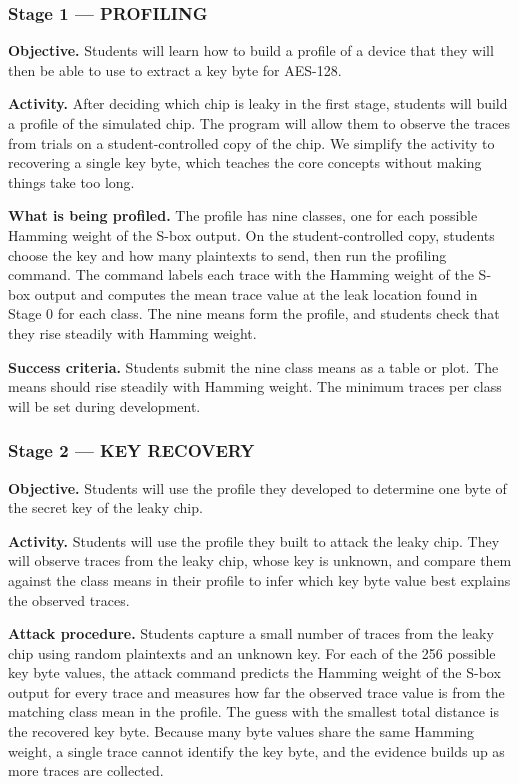 \documentclass[11pt]{article}
\begin{document}
\subsubsection*{Stage 1 --- PROFILING}

\noindent\textbf{Objective.} Students will learn how to build a profile of a device that they will then be able to use to extract a key byte for AES-128.

\noindent\textbf{Activity.} After deciding which chip is leaky in the first stage, students will build a profile of the simulated chip. The program will allow them to observe the traces from trials on a student-controlled copy of the chip. We simplify the activity to recovering a single key byte, which teaches the core concepts without making things take too long. 

\noindent\textbf{What is being profiled.} The profile has nine classes, one for each possible Hamming weight of the S-box output. On the student-controlled copy, students choose the key and how many plaintexts to send, then run the profiling command. The command labels each trace with the Hamming weight of the S-box output and computes the mean trace value at the leak location found in Stage 0 for each class. The nine means form the profile, and students check that they rise steadily with Hamming weight.

\noindent\textbf{Success criteria.} Students submit the nine class means as a table or plot. The means should rise steadily with Hamming weight. The minimum traces per class will be set during development.

\subsubsection*{Stage 2 --- KEY RECOVERY}

\noindent\textbf{Objective.} Students will use the profile they developed to determine one byte of the secret key of the leaky chip.

\noindent\textbf{Activity.} Students will use the profile they built to attack the leaky chip. They will observe traces from the leaky chip, whose key is unknown, and compare them against the class means in their profile to infer which key byte value best explains the observed traces.

\noindent\textbf{Attack procedure.} Students capture a small number of traces from the leaky chip using random plaintexts and an unknown key. For each of the 256 possible key byte values, the attack command predicts the Hamming weight of the S-box output for every trace and measures how far the observed trace value is from the matching class mean in the profile. The guess with the smallest total distance is the recovered key byte. Because many byte values share the same Hamming weight, a single trace cannot identify the key byte, and the evidence builds up as more traces are collected.
\end{document}

